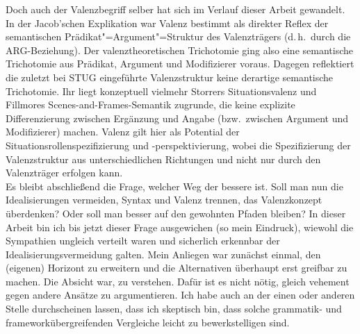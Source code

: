 Doch auch der Valenzbegriff selber hat sich im Verlauf dieser Arbeit gewandelt. In der Jacob'schen Explikation war Valenz bestimmt als direkter Reflex der semantischen Prädikat"=Argument"=Struktur des Valenzträgers (d.\,h.\ durch die ARG-Beziehung). Der valenztheoretischen Trichotomie ging also eine semantische Trichotomie aus Prädikat, Argument und Modifizierer voraus. Dagegen reflektiert die zuletzt bei STUG eingeführte Valenzstruktur keine derartige semantische Trichotomie. Ihr liegt konzeptuell vielmehr Storrers Situationsvalenz und Fillmores Scenes-and-Frames-Semantik zugrunde, die keine explizite Differenzierung zwischen Ergänzung und Angabe (bzw.\ zwischen Argument und Modifizierer) machen. Valenz gilt hier als Potential der Situationsrollenspezifizierung und \mbox{-perspektivierung}, wobei die Spezifizierung der Valenzstruktur aus unterschiedlichen Richtungen und nicht nur durch den Valenzträger erfolgen kann. \\ 

Es bleibt abschließend die Frage, welcher Weg der bessere ist. Soll man nun die Idealisierungen vermeiden, Syntax und Valenz trennen, das Valenzkonzept überdenken? Oder soll man besser auf den gewohnten Pfaden bleiben? In dieser Arbeit bin ich bis jetzt dieser Frage ausgewichen (so mein Eindruck), wiewohl die Sympathien ungleich verteilt waren und sicherlich erkennbar der Idealisierungsvermeidung galten. Mein Anliegen war zunächst einmal, den (eigenen) Horizont zu erweitern und die Alternativen überhaupt erst greifbar zu machen. Die Absicht war, zu verstehen. Dafür ist es nicht nötig, gleich vehement gegen andere Ansätze zu argumentieren. Ich habe auch an der einen oder anderen Stelle durchscheinen lassen, dass ich skeptisch bin, dass solche grammatik- und frameworkübergreifenden Vergleiche leicht zu bewerkstelligen sind. 


